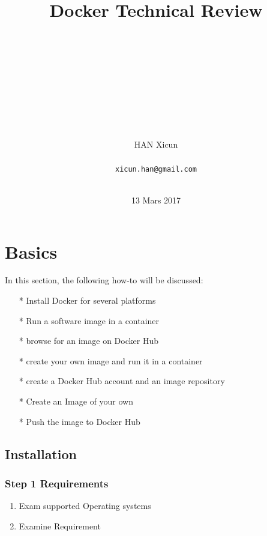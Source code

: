 \documentclass[12pt,a4paper]{article}
\title{Docker Technical Review}
\author{\\\\\\\\\\\\\\\\\\HAN Xicun\\\\
\texttt{xicun.han@gmail.com}\\\\}
\date{13 Mars 2017}
\begin{document}
	\pagestyle{empty}
	\maketitle
	\thispagestyle{empty}
	\clearpage

	\tableofcontents
	\newpage
	\renewcommand\listoflistingscaption{List of source codes}
	\listoflistings

	\thispagestyle{empty}
	\newpage
	\pagestyle{fancy}
	\lhead{}
	\chead{}
	\pagebreak
	\FloatBarrier


\newpage

\section{Basics}

In this section, the following how-to will be discussed: \\

\begin{itemize}
	\item[*] Install Docker for several platforms
	\item[*] Run a software image in a container
	\item[*] browse for an image on Docker Hub
	\item[*] create your own image and run it in a container
	\item[*] create a Docker Hub account and an image repository
	\item[*] Create an Image of your own
	\item[*] Push the image to Docker Hub\\
\end{itemize}

\subsection{Installation}

\subsubsection*{Step 1 Requirements}

\begin{enumerate}
	\item Exam supported Operating systems
	\item Examine Requirement
\end{enumerate}
\end{document}
